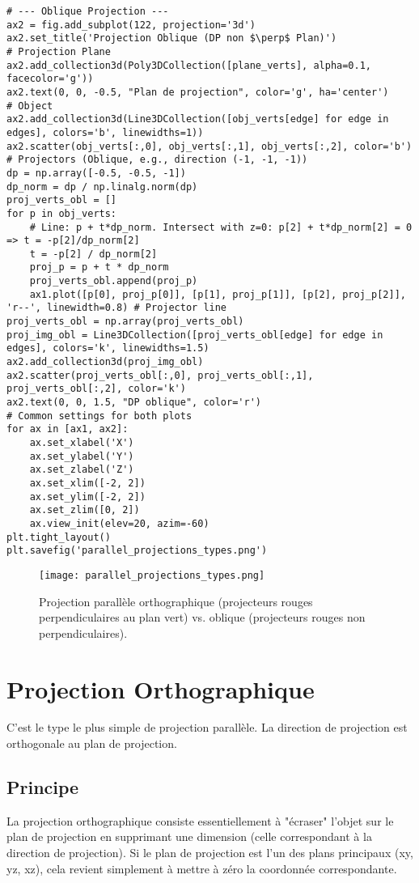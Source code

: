 \begin{verbatim}
# --- Oblique Projection ---
ax2 = fig.add_subplot(122, projection='3d')
ax2.set_title('Projection Oblique (DP non $\perp$ Plan)')
# Projection Plane
ax2.add_collection3d(Poly3DCollection([plane_verts], alpha=0.1, facecolor='g'))
ax2.text(0, 0, -0.5, "Plan de projection", color='g', ha='center')
# Object
ax2.add_collection3d(Line3DCollection([obj_verts[edge] for edge in edges], colors='b', linewidths=1))
ax2.scatter(obj_verts[:,0], obj_verts[:,1], obj_verts[:,2], color='b')
# Projectors (Oblique, e.g., direction (-1, -1, -1))
dp = np.array([-0.5, -0.5, -1])
dp_norm = dp / np.linalg.norm(dp)
proj_verts_obl = []
for p in obj_verts:
    # Line: p + t*dp_norm. Intersect with z=0: p[2] + t*dp_norm[2] = 0 => t = -p[2]/dp_norm[2]
    t = -p[2] / dp_norm[2]
    proj_p = p + t * dp_norm
    proj_verts_obl.append(proj_p)
    ax1.plot([p[0], proj_p[0]], [p[1], proj_p[1]], [p[2], proj_p[2]], 'r--', linewidth=0.8) # Projector line
proj_verts_obl = np.array(proj_verts_obl)
proj_img_obl = Line3DCollection([proj_verts_obl[edge] for edge in edges], colors='k', linewidths=1.5)
ax2.add_collection3d(proj_img_obl)
ax2.scatter(proj_verts_obl[:,0], proj_verts_obl[:,1], proj_verts_obl[:,2], color='k')
ax2.text(0, 0, 1.5, "DP oblique", color='r')
# Common settings for both plots
for ax in [ax1, ax2]:
    ax.set_xlabel('X')
    ax.set_ylabel('Y')
    ax.set_zlabel('Z')
    ax.set_xlim([-2, 2])
    ax.set_ylim([-2, 2])
    ax.set_zlim([0, 2])
    ax.view_init(elev=20, azim=-60)
plt.tight_layout()
plt.savefig('parallel_projections_types.png')
\end{verbatim}
\begin{figure}[H]
\centering
\texttt{[image: parallel\_projections\_types.png]}
\caption{Projection parallèle orthographique (projecteurs rouges perpendiculaires au plan vert) vs. oblique (projecteurs rouges non perpendiculaires).}
\label{fig:parallel_projections_types}
\end{figure}
\section{Projection Orthographique}
C'est le type le plus simple de projection parallèle. La direction de projection est orthogonale au plan de projection.
\subsection{Principe}
La projection orthographique consiste essentiellement à "écraser" l'objet sur le plan de projection en supprimant une dimension (celle correspondant à la direction de projection). Si le plan de projection est l'un des plans principaux (xy, yz, xz), cela revient simplement à mettre à zéro la coordonnée correspondante.
